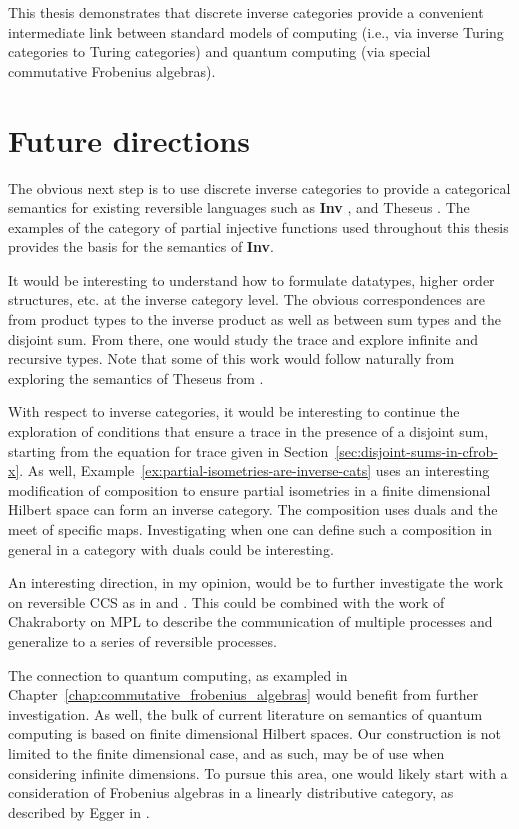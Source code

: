 This thesis demonstrates that discrete inverse categories provide a convenient intermediate link
between standard models of computing (i.e., via inverse Turing categories to Turing categories) and
quantum computing (via special commutative Frobenius algebras).

\section{Future directions}
\label{sec:whither-next}

The obvious next step is to use discrete inverse categories to provide a categorical semantics for
existing reversible languages such as \textbf{Inv} \cite{muetal04:injreversible}, and Theseus
\cite{james2013isomorphic,james2012information}. The examples of the category of partial injective
functions used throughout this thesis provides the basis for the semantics of \textbf{Inv}.

It would be interesting to understand how to formulate datatypes, higher order structures, etc. at the
inverse category level. The obvious correspondences are from product types to the inverse product as
well as between sum types and the disjoint sum. From there, one would study the trace and explore
infinite and recursive types. Note that some of this work would follow naturally from exploring the semantics
of Theseus from \cite{james2013isomorphic,james2012information}.

With respect to inverse categories, it would be interesting to continue the exploration of
conditions that ensure a trace in the presence of a disjoint sum, starting from the equation for
trace given in Section~\ref{sec:disjoint-sums-in-cfrob-x}. As well,
Example~\ref{ex:partial-isometries-are-inverse-cats} uses an interesting modification of composition
to ensure partial isometries in a finite dimensional Hilbert space can form an inverse category. The
composition uses duals and the meet of specific maps. Investigating when one can define such a
composition in general in a category with duals could be interesting.

An interesting direction, in my opinion, would be to further investigate the work on reversible
CCS as in \cite{danos2004reversible} and \cite{phillips2006operational}. This could be combined with
the work of Chakraborty on MPL \cite{chakraborty2014} to describe the communication of multiple
processes and generalize to a series of reversible processes.


The connection to quantum computing, as exampled in
Chapter~\ref{chap:commutative_frobenius_algebras} would benefit from further investigation. As well,
the bulk of current literature on semantics of quantum computing is based on finite dimensional
Hilbert spaces. Our construction is not limited to the finite dimensional
case, and as such, may be of use when considering infinite dimensions. To pursue this area, one
would likely start with a consideration of Frobenius algebras in a linearly distributive category,
as described by Egger in \cite{egger2010frobenius}.


